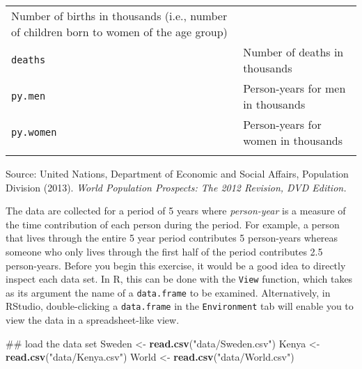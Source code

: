 \documentclass[]{article}
\newenvironment{Shaded}{\begin{snugshade}}{\end{snugshade}}
\newcommand{\KeywordTok}[1]{\textcolor[rgb]{0.13,0.29,0.53}{\textbf{{#1}}}}
\newcommand{\StringTok}[1]{\textcolor[rgb]{0.31,0.60,0.02}{{#1}}}
\newcommand{\NormalTok}[1]{{#1}}
\begin{document}
\begin{longtable}[c]{@{}ll@{}}
\begin{minipage}[t]{0.68\columnwidth}
Number of births in thousands (i.e., number of children born to women of
the age group)
\end{minipage}
\\\addlinespace
\begin{minipage}[t]{0.25\columnwidth}\raggedright
\texttt{deaths}
\end{minipage} & \begin{minipage}[t]{0.68\columnwidth}\raggedright
Number of deaths in thousands
\end{minipage}
\\\addlinespace
\begin{minipage}[t]{0.25\columnwidth}\raggedright
\texttt{py.men}
\end{minipage} & \begin{minipage}[t]{0.68\columnwidth}\raggedright
Person-years for men in thousands
\end{minipage}
\\\addlinespace
\begin{minipage}[t]{0.25\columnwidth}\raggedright
\texttt{py.women}
\end{minipage} & \begin{minipage}[t]{0.68\columnwidth}\raggedright
Person-years for women in thousands
\end{minipage}
\\\addlinespace
\bottomrule
\end{longtable}

Source: United Nations, Department of Economic and Social Affairs,
Population Division (2013). \emph{World Population Prospects: The 2012
Revision, DVD Edition.}

The data are collected for a period of 5 years where \emph{person-year}
is a measure of the time contribution of each person during the period.
For example, a person that lives through the entire 5 year period
contributes 5 person-years whereas someone who only lives through the
first half of the period contributes 2.5 person-years. Before you begin
this exercise, it would be a good idea to directly inspect each data
set. In R, this can be done with the \texttt{View} function, which takes
as its argument the name of a \texttt{data.frame} to be examined.
Alternatively, in RStudio, double-clicking a \texttt{data.frame} in the
\texttt{Environment} tab will enable you to view the data in a
spreadsheet-like view.

\begin{Shaded}
\begin{Highlighting}[]
\NormalTok{## load the data set}
\NormalTok{Sweden <-}\StringTok{ }\KeywordTok{read.csv}\NormalTok{(}\StringTok{"data/Sweden.csv"}\NormalTok{)}
\NormalTok{Kenya <-}\StringTok{ }\KeywordTok{read.csv}\NormalTok{(}\StringTok{"data/Kenya.csv"}\NormalTok{)}
\NormalTok{World <-}\StringTok{ }\KeywordTok{read.csv}\NormalTok{(}\StringTok{"data/World.csv"}\NormalTok{)}
\end{Highlighting}
\end{Shaded}
\end{document}

